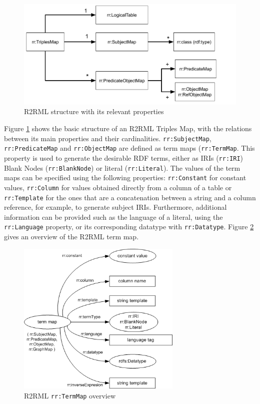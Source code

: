 \begin{figure}[!t]
\centering
\includegraphics[width=\textwidth]{figures/state-of-the-art/R2RML-structure.pdf}
\caption{R2RML structure with its relevant properties~\citep{R2RML}}
\label{fig:soa_r2rml-structure}
\end{figure}

Figure \ref{fig:soa_r2rml-structure} shows the basic structure of an R2RML Triples Map, with the relations between its main properties and their cardinalities. \texttt{rr:SubjectMap}, \texttt{rr:PredicateMap} and \texttt{rr:ObjectMap} are defined as term maps (\texttt{rr:TermMap}. This property is used to generate the desirable RDF terms, either as IRIs (\texttt{rr:IRI}) Blank Nodes (\texttt{rr:BlankNode}) or literal (\texttt{rr:Literal}). The values of the term maps can be specified using the following properties: \texttt{rr:Constant} for constant values, \texttt{rr:Column} for values obtained directly from a column of a table or \texttt{rr:Template} for the ones that are a concatenation between a string and a column reference, for example, to generate subject IRIs. Furthermore, additional information can be provided such as the language of a literal, using the \texttt{rr:Language} property, or its corresponding datatype with \texttt{rr:Datatype}. Figure \ref{fig:soa_termmap-structure} gives an overview of the R2RML term map.


\begin{figure}[!t]
\centering
\includegraphics[width=0.7\textwidth]{figures/state-of-the-art/term-map.png}
\caption{R2RML \texttt{rr:TermMap} overview~\citep{R2RML}}
\label{fig:soa_termmap-structure}
\end{figure}

